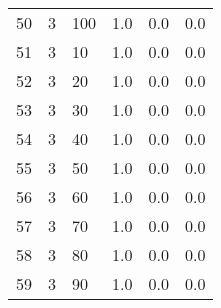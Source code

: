 \documentclass{article}
\begin{document}
\begin{center}
\begin{tabular}{llllll}
50 &         3 &        100 &              1.0 &                       0.0 &                                   0.0 \\
51 &         3 &         10 &              1.0 &                       0.0 &                                   0.0 \\
52 &         3 &         20 &              1.0 &                       0.0 &                                   0.0 \\
53 &         3 &         30 &              1.0 &                       0.0 &                                   0.0 \\
54 &         3 &         40 &              1.0 &                       0.0 &                                   0.0 \\
55 &         3 &         50 &              1.0 &                       0.0 &                                   0.0 \\
56 &         3 &         60 &              1.0 &                       0.0 &                                   0.0 \\
57 &         3 &         70 &              1.0 &                       0.0 &                                   0.0 \\
58 &         3 &         80 &              1.0 &                       0.0 &                                   0.0 \\
59 &         3 &         90 &              1.0 &                       0.0 &                                   0.0 \\
\bottomrule
\end{tabular}
\end{center}
\newpage
\end{document}
